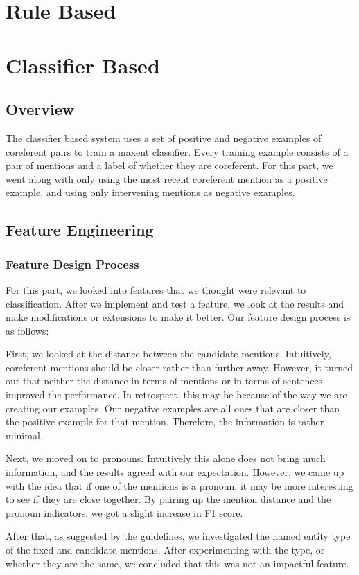 \documentclass[12pt, twocolumn]{article}
\begin{document}
\section{Rule Based}

\section{Classifier Based}
\subsection{Overview}
The classifier based system uses a set of positive and negative examples of coreferent pairs to train a maxent classifier. Every training example consists of a pair of mentions and a label of whether they are coreferent. For this part, we went along with only using the most recent coreferent mention as a positive example, and using only intervening mentions as negative examples. 
\subsection{Feature Engineering}
\subsubsection{Feature Design Process}
For this part, we looked into features that we thought were relevant to classification. After we implement and test a feature, we look at the results and make modifications or extensions to make it better. Our feature design process is as follows:

First, we looked at the distance between the candidate mentions. Intuitively, coreferent mentions should be closer rather than further away. However, it turned out that neither the distance in terms of mentions or in terms of sentences improved the performance. In retrospect, this may be because of the way we are creating our examples. Our negative examples are all ones that are closer than the positive example for that mention. Therefore, the information is rather minimal.

Next, we moved on to pronouns. Intuitively this alone does not bring much information, and the results agreed with our expectation. However, we came up with the idea that if one of the mentions is a pronoun, it may be more interesting to see if they are close together. By pairing up the mention distance and the pronoun indicators, we got a slight increase in F1 score.

After that, as suggested by the guidelines, we investigated the named entity type of the fixed and candidate mentions. After experimenting with the type, or whether they are the same, we concluded that this was not an impactful feature.
\end{document}
